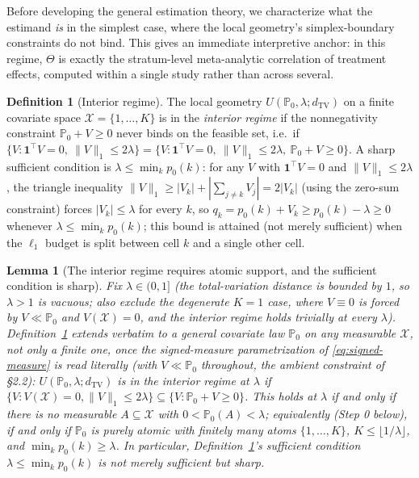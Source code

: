 \documentclass[11pt]{article}
\theoremstyle{plain}
\newtheorem{lemma}[theorem]{Lemma}
\theoremstyle{definition}
\newtheorem{definition}[theorem]{Definition}
\theoremstyle{remark}
\newcommand{\PP}{\mathbb{P}}
\newcommand{\cX}{\mathcal{X}}
\begin{document}
Before developing the general estimation theory, we characterize what the estimand
\emph{is} in the simplest case, where the local geometry's simplex-boundary
constraints do not bind. This gives an immediate interpretive anchor: in this regime,
$\Theta$ is exactly the stratum-level meta-analytic correlation of treatment effects,
computed within a single study rather than across several.

\begin{definition}[Interior regime]\label{def:interior}
The local geometry $U(\PP_0,\lambda;d_{\mathrm{TV}})$ on a finite covariate space
$\cX=\{1,\dots,K\}$ is in the \emph{interior regime} if the nonnegativity constraint
$\PP_0+V\ge0$ never binds on the feasible set, i.e.\ if
$\{V:\mathbf 1^\top V=0,\ \|V\|_1\le2\lambda\} = \{V:\mathbf 1^\top V=0,\ \|V\|_1\le2\lambda,\ \PP_0+V\ge0\}$.
A sharp sufficient condition is $\lambda\le\min_k p_0(k)$: for any $V$ with
$\mathbf1^\top V=0$ and $\|V\|_1\le2\lambda$, the triangle inequality
$\|V\|_1\ge|V_k|+|\sum_{j\ne k}V_j|=2|V_k|$ (using the zero-sum constraint) forces
$|V_k|\le\lambda$ for every $k$, so $q_k=p_0(k)+V_k\ge p_0(k)-\lambda\ge0$ whenever
$\lambda\le\min_kp_0(k)$; this bound is attained (not merely sufficient) when the
$\ell_1$ budget is split between cell $k$ and a single other cell.
\end{definition}

\begin{lemma}[The interior regime requires atomic support, and the sufficient
condition is sharp]\label{lem:interior-atomic}
Fix $\lambda\in(0,1]$ (the total-variation distance is bounded by $1$, so
$\lambda>1$ is vacuous; also exclude the degenerate $K=1$ case, where $V\equiv0$ is
forced by $V\ll\PP_0$ and $V(\cX)=0$, and the interior regime holds trivially at
every $\lambda$). Definition~\ref{def:interior} extends verbatim to a general
covariate law $\PP_0$ on any measurable $\cX$, not only a finite one, once the
signed-measure parametrization of \eqref{eq:signed-measure} is read literally (with
$V\ll\PP_0$ throughout, the ambient constraint of \S2.2): $U(\PP_0,\lambda;d_{\mathrm{TV}})$
is in the interior regime at $\lambda$ if $\{V:V(\cX)=0,\|V\|_1\le2\lambda\}\subseteq\{V:\PP_0+V\ge0\}$.
This holds at $\lambda$ if and only if there is no measurable $A\subseteq\cX$ with
$0<\PP_0(A)<\lambda$; equivalently (Step 0 below), if and only if $\PP_0$ is purely
atomic with finitely many atoms $\{1,\dots,K\}$, $K\le\lfloor1/\lambda\rfloor$, and
$\min_k p_0(k)\ge\lambda$. In particular, Definition~\ref{def:interior}'s sufficient
condition $\lambda\le\min_kp_0(k)$ is not merely sufficient but \emph{sharp}.
\end{lemma}
\end{document}
